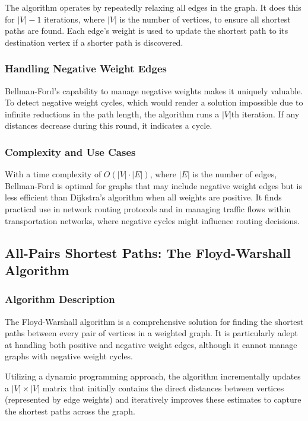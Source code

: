 \documentclass[12pt]{book} %
\begin{document}
The algorithm operates by repeatedly relaxing all edges in the graph. It does this for \(|V|-1\) iterations, where \(|V|\) is the number of vertices, to ensure all shortest paths are found. Each edge's weight is used to update the shortest path to its destination vertex if a shorter path is discovered.

\subsubsection{Handling Negative Weight Edges}

Bellman-Ford's capability to manage negative weights makes it uniquely valuable. To detect negative weight cycles, which would render a solution impossible due to infinite reductions in the path length, the algorithm runs a \(|V|\)th iteration. If any distances decrease during this round, it indicates a cycle.

\subsubsection{Complexity and Use Cases}

With a time complexity of \(O(|V| \cdot |E|)\), where \(|E|\) is the number of edges, Bellman-Ford is optimal for graphs that may include negative weight edges but is less efficient than Dijkstra's algorithm when all weights are positive. It finds practical use in network routing protocols and in managing traffic flows within transportation networks, where negative cycles might influence routing decisions.


\subsection{All-Pairs Shortest Paths: The Floyd-Warshall Algorithm}

\subsubsection{Algorithm Description}

The Floyd-Warshall algorithm is a comprehensive solution for finding the shortest paths between every pair of vertices in a weighted graph. It is particularly adept at handling both positive and negative weight edges, although it cannot manage graphs with negative weight cycles.

Utilizing a dynamic programming approach, the algorithm incrementally updates a \(|V| \times |V|\) matrix that initially contains the direct distances between vertices (represented by edge weights) and iteratively improves these estimates to capture the shortest paths across the graph.
\end{document}
